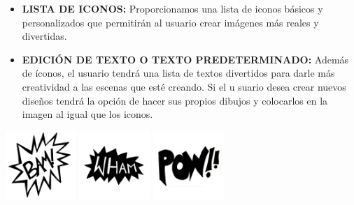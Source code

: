 \documentclass[utf8]{beamer}
\begin{document}
	\begin{frame}
		\begin{center}
			\begin{itemize}
				\vspace{0.5cm}
				\item\textbf{LISTA DE ICONOS:}
				\newline
				Proporcionamos una lista de iconos básicos y personalizados que
				\newline
				 permitirán al usuario crear imágenes más reales y divertidas.
				\newline
				\pause
				\item\textbf{EDICIÓN DE TEXTO O TEXTO PREDETERMINADO:}
				\newline
				Además de íconos, el usuario tendrá una lista de textos divertidos
				\newline
				para darle más creatividad a las escenas que esté creando. Si el u
				\newline
				 suario desea crear nuevos diseños tendrá la opción de hacer sus 
				\newline
				 propios dibujos y colocarlos en la imagen al igual que los iconos.
			\end{itemize}
		\end{center} 
		\pause
		\begin{center}
			\begingroup
				\includegraphics[width=0.2\textwidth]{icono1.jpg}
			\endgroup
			\pause
			\begingroup
				\includegraphics[width=0.2\textwidth]{icono2.jpg}
			\endgroup
			\pause
			\begingroup
				\includegraphics[width=0.2\textwidth]{icono3.jpg}
			\endgroup
		\end{center}
	\end{frame}	
\end{document}

